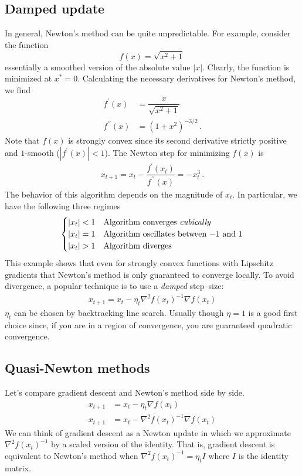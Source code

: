 \subsection{Damped update}
In general, Newton's method can be quite unpredictable.
For example, consider the function 
\[
f(x) = \sqrt{x^2 +1}\,
\] 
essentially a smoothed version of the absolute value $|x|$.
Clearly, the function is minimized at $x^* = 0$. 
Calculating the necessary derivatives for Newton's method, we find
\begin{align*}
    f^\prime (x) &= \dfrac{x}{\sqrt{x^2 + 1}}\, \\
    f^{\prime \prime} (x) &= (1+x^2)^{-3/2}\,.
\end{align*}
Note that $f(x)$ is strongly convex since its second derivative strictly positive 
and $1$-smooth ($|f^\prime (x)| < 1$). 
The Newton step for minimizing $f(x)$ is
\begin{align*}
    x_{t+1} = x_t - \dfrac{f^\prime (x_t)}{f^{\prime \prime}(x)} = -x_t^3\,.
\end{align*}
The behavior of this algorithm depends on the magnitude of $x_t$. 
In particular, we have the following three regimes
\[ \begin{cases} 
      |x_t| < 1 & \text{Algorithm converges \textit{cubically}}\\
      |x_t| = 1 & \text{Algorithm oscillates between $-1$ and $1$} \\
      |x_t| > 1 & \text{Algorithm diverges} 
   \end{cases}
\]
This example shows that even for strongly convex functions with Lipschitz gradients that Newton's method is only guaranteed to converge locally. To avoid divergence, a popular technique is to use a \textit{damped} step--size:
\begin{align*}
    x_{t+1} = x_t - \eta_t \nabla^2 f(x_t)^{-1} \nabla f(x_t)
\end{align*}
$\eta_t$ can be chosen by backtracking line search. Usually though $\eta = 1$ is a good first choice since, if you are in a region of convergence, you are guaranteed quadratic convergence.

\subsection{Quasi-Newton methods}
Let's compare gradient descent and Newton's method side by side.
    \begin{align*}
        x_{t+1} &= x_t - \eta_t \nabla f(x_t) \tag{Gradient descent}\\
        x_{t+1} &= x_t - \nabla^2 f(x_t)^{-1} \nabla f(x_t) \tag{Newton's method}
    \end{align*}
We can think of gradient descent as a Newton update in which we approximate
$\nabla^2 f(x_t)^{-1}$ by a scaled version of the identity. 
That is, gradient descent is equivalent to Newton's method when $\nabla^2
f(x_t)^{-1} = \eta_t I$ where $I$ is the identity matrix. 

